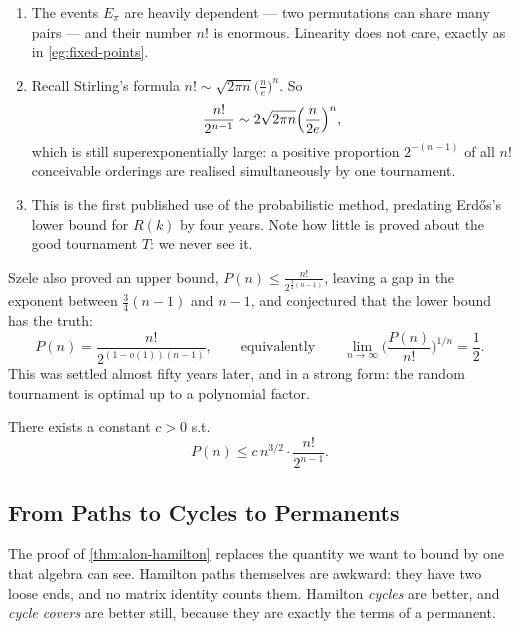 \begin{remark}\hfill
    \begin{enumerate}[(1)]
        \item The events \(E_\pi\) are heavily dependent --- two permutations can share many pairs --- and their number \(n!\) is enormous. Linearity does not care, exactly as in \autoref{eg:fixed-points}.
        \item Recall Stirling's formula \(n! \sim \sqrt{2\pi n} \bigl( \frac{n}{e} \bigr)^n\). So
        \[
            \frac{n!}{2^{n-1}} \sim 2\sqrt{2 \pi n} \Bigl( \frac{n}{2e} \Bigr)^n,
        \]
        which is still superexponentially large: a positive proportion \(2^{-(n-1)}\) of all \(n!\) conceivable orderings are realised simultaneously by one tournament.
        \item This is the first published use of the probabilistic method, predating Erd\H{o}s's lower bound for \(R(k)\) by four years. Note how little is proved about the good tournament \(T\): we never see it.
    \end{enumerate}
\end{remark}

Szele also proved an upper bound, \(P(n) \le \frac{n!}{2^{\frac{3}{4}(n-1)}}\), leaving a gap in the exponent between \(\frac{3}{4}(n-1)\) and \(n-1\), and conjectured that the lower bound has the truth:
\[
    P(n) = \frac{n!}{2^{(1-o(1))(n-1)}}, \qquad \text{equivalently} \qquad \lim_{n \to \infty} \biggl( \frac{P(n)}{n!} \biggr)^{1/n} = \frac{1}{2}.
\]
This was settled almost fifty years later, and in a strong form: the random tournament is optimal up to a polynomial factor.

\begin{theorem}[Alon, 1990]\label{thm:alon-hamilton}
    There exists a constant \(c > 0\) s.t.
    \[
        P(n) \le c\, n^{3/2} \cdot \frac{n!}{2^{n-1}}.
    \]
\end{theorem}

\subsection{From Paths to Cycles to Permanents}

The proof of \autoref{thm:alon-hamilton} replaces the quantity we want to bound by one that algebra can see. Hamilton paths themselves are awkward: they have two loose ends, and no matrix identity counts them. Hamilton \emph{cycles} are better, and \emph{cycle covers} are better still, because they are exactly the terms of a permanent.

